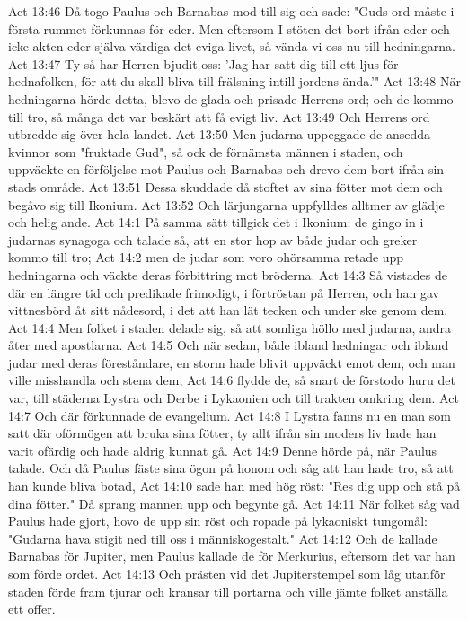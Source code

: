 Act 13:46  Då togo Paulus och Barnabas mod till sig och sade: "Guds ord måste i första rummet förkunnas för eder. Men eftersom I stöten det bort ifrån eder och icke akten eder själva värdiga det eviga livet, så vända vi oss nu till hedningarna.
Act 13:47  Ty så har Herren bjudit oss: 'Jag har satt dig till ett ljus för hednafolken, för att du skall bliva till frälsning intill jordens ända.'"
Act 13:48  När hedningarna hörde detta, blevo de glada och prisade Herrens ord; och de kommo till tro, så många det var beskärt att få evigt liv.
Act 13:49  Och Herrens ord utbredde sig över hela landet.
Act 13:50  Men judarna uppeggade de ansedda kvinnor som "fruktade Gud", så ock de förnämsta männen i staden, och uppväckte en förföljelse mot Paulus och Barnabas och drevo dem bort ifrån sin stads område.
Act 13:51  Dessa skuddade då stoftet av sina fötter mot dem och begåvo sig till Ikonium.
Act 13:52  Och lärjungarna uppfylldes alltmer av glädje och helig ande.
Act 14:1  På samma sätt tillgick det i Ikonium: de gingo in i judarnas synagoga och talade så, att en stor hop av både judar och greker kommo till tro;
Act 14:2  men de judar som voro ohörsamma retade upp hedningarna och väckte deras förbittring mot bröderna.
Act 14:3  Så vistades de där en längre tid och predikade frimodigt, i förtröstan på Herren, och han gav vittnesbörd åt sitt nådesord, i det att han lät tecken och under ske genom dem.
Act 14:4  Men folket i staden delade sig, så att somliga höllo med judarna, andra åter med apostlarna.
Act 14:5  Och när sedan, både ibland hedningar och ibland judar med deras föreståndare, en storm hade blivit uppväckt emot dem, och man ville misshandla och stena dem,
Act 14:6  flydde de, så snart de förstodo huru det var, till städerna Lystra och Derbe i Lykaonien och till trakten omkring dem.
Act 14:7  Och där förkunnade de evangelium.
Act 14:8  I Lystra fanns nu en man som satt där oförmögen att bruka sina fötter, ty allt ifrån sin moders liv hade han varit ofärdig och hade aldrig kunnat gå.
Act 14:9  Denne hörde på, när Paulus talade. Och då Paulus fäste sina ögon på honom och såg att han hade tro, så att han kunde bliva botad,
Act 14:10  sade han med hög röst: "Res dig upp och stå på dina fötter." Då sprang mannen upp och begynte gå.
Act 14:11  När folket såg vad Paulus hade gjort, hovo de upp sin röst och ropade på lykaoniskt tungomål: "Gudarna hava stigit ned till oss i människogestalt."
Act 14:12  Och de kallade Barnabas för Jupiter, men Paulus kallade de för Merkurius, eftersom det var han som förde ordet.
Act 14:13  Och prästen vid det Jupiterstempel som låg utanför staden förde fram tjurar och kransar till portarna och ville jämte folket anställa ett offer.
